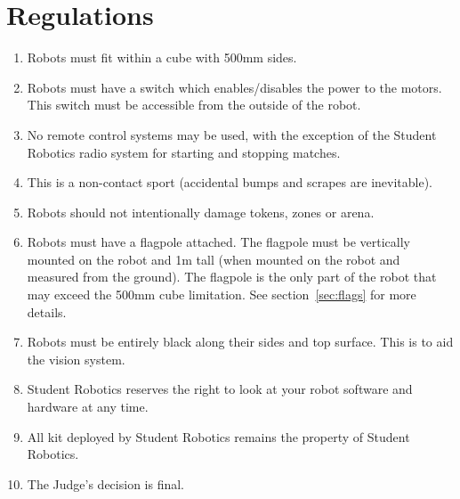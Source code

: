 \section {Regulations}
\label{regs}

\begin{enumerate}
\item Robots must fit within a cube with 500mm sides.
\item Robots must have a switch which enables/disables the power to the motors.  This switch must be accessible from the outside of the robot.
\item No remote control systems may be used, with the exception of the Student Robotics radio system for starting and stopping matches.
\item This is a non-contact sport (accidental bumps and scrapes are inevitable).
\item Robots should not intentionally damage tokens, zones or arena.

\item Robots must have a flagpole attached.  The flagpole must be vertically mounted on the robot and 1m tall (when mounted on the robot and measured from the ground).  The flagpole is the only part of the robot that may exceed the 500mm cube limitation.  See section~\ref{sec:flags} for more details.

\item Robots must be entirely black along their sides and top surface.  This is to aid the vision system.

\item Student Robotics reserves the right to look at your robot software and hardware at any time.
\item All kit deployed by Student Robotics remains the property of Student Robotics.
\item The Judge's decision is final.
\end{enumerate}

